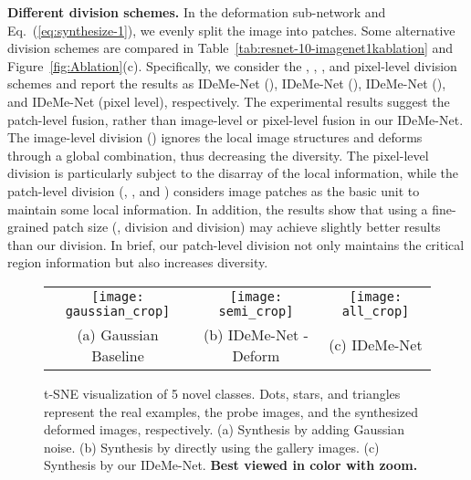 \documentclass[10pt,letterpaper,twocolumn]{article}
\providecommand{\tabularnewline}{\\}
\begin{document}
\noindent \textbf{Different division schemes. }In the deformation
sub-network and Eq.~(\ref{eq:synthesize-1}), we evenly split the
image into  patches. Some alternative division schemes
are compared in Table~\ref{tab:resnet-10-imagenet1kablation} and Figure~\ref{fig:Ablation}(c).
Specifically, we consider the , , ,
and pixel-level division schemes
and report the results as IDeMe-Net (), IDeMe-Net (),
IDeMe-Net (), and IDeMe-Net (pixel level), respectively.
The experimental results suggest the patch-level fusion, rather than
image-level or pixel-level fusion in our IDeMe-Net. The image-level
division () ignores the local image structures  and deforms through
a global combination, thus decreasing the diversity. The pixel-level
division is particularly subject to the disarray of the local information,
while the patch-level division (, , and )
considers image patches as the basic unit to maintain some local information.
In addition, the results show that using a fine-grained patch size
(\eg,  division and  division) may achieve
slightly better results than our  division. In
brief, our patch-level division not only maintains the critical
region information but also increases diversity.

\noindent 
\begin{figure}
\centering 
\begin{centering}
\begin{tabular}{ccc}
\hspace{-0.3cm}\texttt{[image: gaussian\_crop]}
\hspace{-0.4cm}  & \texttt{[image: semi\_crop]} \hspace{-0.4cm}  & \texttt{[image: all\_crop]}\tabularnewline
{\scriptsize{}{}(a) Gaussian Baseline }  & {\scriptsize{}{}(b) IDeMe-Net - Deform }  & {\scriptsize{}{}(c) IDeMe-Net}\tabularnewline
\end{tabular}
\par\end{centering}
\vspace{0.1in}
\caption{\label{fig:tsne}t-SNE visualization of 5 novel classes. Dots, stars, and triangles represent
the real examples, the probe images, and the synthesized deformed
images, respectively. (a) Synthesis by adding Gaussian noise. (b)
Synthesis by directly using the gallery images. (c) Synthesis by our
IDeMe-Net. \textbf{Best viewed in color with zoom.}}



\end{figure}
\end{document}
